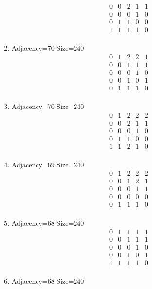 \documentclass[12pt]{article}
\begin{document}
\begin{multicols}{3}
\begin{enumerate}
\begin{equation*}
\begin{array}{ccccc}
0&0&2&1&1\\
0&0&0&1&0\\
0&1&1&0&0\\
1&1&1&1&0\\
\end{array}
\end{equation*}
\item Adjacency=70 Size=240
\begin{equation*}
\begin{array}{ccccc}
0&1&2&2&1\\
0&0&1&1&1\\
0&0&0&1&0\\
0&0&1&0&1\\
0&1&1&1&0\\
\end{array}
\end{equation*}
\item Adjacency=70 Size=240
\begin{equation*}
\begin{array}{ccccc}
0&1&2&2&2\\
0&0&2&1&1\\
0&0&0&1&0\\
0&1&1&0&0\\
1&1&2&1&0\\
\end{array}
\end{equation*}
\item Adjacency=69 Size=240
\begin{equation*}
\begin{array}{ccccc}
0&1&2&2&2\\
0&0&1&2&1\\
0&0&0&1&1\\
0&0&0&0&0\\
0&1&1&1&0\\
\end{array}
\end{equation*}
\item Adjacency=68 Size=240
\begin{equation*}
\begin{array}{ccccc}
0&1&1&1&1\\
0&0&1&1&1\\
0&0&0&1&0\\
0&0&1&0&1\\
1&1&1&1&0\\
\end{array}
\end{equation*}
\item Adjacency=68 Size=240

\end{enumerate}
\end{multicols}
\end{document}
